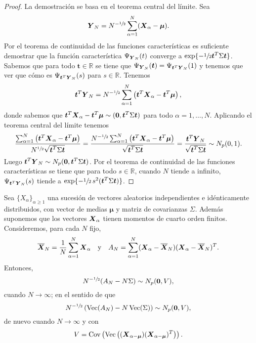 \begin{proof}
  La demostración se basa en el teorema central del límite.
  Sea \[
  \boldsymbol{Y}_N = N^{-\sfrac{1}{2}} \sum_{\alpha = 1}^N (\boldsymbol{X}_{\alpha} - \boldsymbol \mu).
  \]
  Por el teorema de continuidad de las funciones características es suficiente demostrar que la función característica \(\Psi_{\boldsymbol{Y}_N}(t)\) converge a \(\exp\{-\sfrac{1}{2}\boldsymbol t^T\Sigma\boldsymbol t\}\).
  Sabemos que para todo \(\boldsymbol t \in \mathbb R \) se tiene que \(\Psi_{\boldsymbol{Y}_N}(\boldsymbol t) = \Psi_{\boldsymbol t^T\boldsymbol{Y}_N}(1)\) y tenemos que ver que cómo es \(\Psi_{\boldsymbol t^T \boldsymbol{Y}_N}(s)\) para \(s \in \mathbb R\).
  Tenemos \[
    \boldsymbol t^T\boldsymbol{Y}_N = N^{-\sfrac{1}{2}}\sum_{\alpha = 1}^{N}\left(\boldsymbol t^T\boldsymbol{X}_{\alpha} - \boldsymbol t^T\boldsymbol\mu\right),
  \]
  donde sabemos que \(\boldsymbol t^T \boldsymbol{X}_{\alpha} - \boldsymbol t^T \boldsymbol \mu \sim (\boldsymbol 0, \boldsymbol t^T\Sigma \boldsymbol t)\) para todo \(\alpha = 1, \dots, N\).
  Aplicando el teorema central del límite tenemos \[
    \frac{\sum_{\alpha = 1}^{N}\left(\boldsymbol t^T\boldsymbol{X}_{\alpha} - \boldsymbol t^T\boldsymbol\mu\right)}{N^{\sfrac{1}{2}}\sqrt{\boldsymbol t^T\Sigma \boldsymbol t}} 
    = \frac{N^{-\sfrac{1}{2}}\sum_{\alpha = 1}^{N}\left(\boldsymbol t^T\boldsymbol{X}_{\alpha} - \boldsymbol t^T\boldsymbol\mu\right)}{\sqrt{\boldsymbol t^T\Sigma \boldsymbol t}}
    = \frac{\boldsymbol t^T \boldsymbol{Y}_N}{\sqrt{\boldsymbol t^T\Sigma \boldsymbol t}}
    \sim N_p(0, 1).
  \]
  Luego \(\boldsymbol t^T\boldsymbol{Y}_N \sim N_p(\boldsymbol 0, \boldsymbol t^T \Sigma \boldsymbol t)\). 
  Por el teorema de continuidad de las funciones características se tiene que para todo \(s \in \mathbb R\), cuando \(N\) tiende a infinito, \(\Psi_{\boldsymbol t^T\boldsymbol{Y}_N}(s)\) tiende a \(\exp\{-\sfrac{1}{2}\,s^2(\boldsymbol t^T\Sigma \boldsymbol t)\}\).
\end{proof}

\begin{nprop}
  Sea \(\{X_{\alpha}\}_{\alpha \geq 1}\) una sucesión de vectores aleatorios independientes e idénticamente distribuidos, con vector de medias \(\boldsymbol \mu\) y matriz de covarianzas \(\Sigma\).
  Además suponemos que los vectores \(\boldsymbol{X}_{\alpha}\) tienen momentos de cuarto orden finitos.
  Consideremos, para cada \(N\) fijo,
  \[
    \overline{\boldsymbol{X}}_N = \frac{1}{N}\sum_{\alpha = 1}^N \boldsymbol{X}_{\alpha}
    \quad
    \text{y}
    \quad
    A_N = \sum_{\alpha = 1}^N (\boldsymbol{X}_{\alpha} - \overline{\boldsymbol{X}}_N)(\boldsymbol{X}_{\alpha} - \overline{\boldsymbol{X}}_N)^T.
  \]
  Entonces, \[
    N^{-\sfrac{1}{2}}(A_N - N\Sigma) \sim N_p(\boldsymbol 0, V),
  \] cuando \(N \to \infty\); en el sentido de que \[
    N^{-\sfrac{1}{2}}\left(\operatorname{Vec}(A_N) - N\operatorname{Vec}(\Sigma)\right) \sim N_p(\boldsymbol 0, V),
  \] de nuevo cuando \(N \to \infty\) y con \[
    V = \operatorname{Cov}\left(\operatorname{Vec}\left((\boldsymbol{X}_{\alpha - \boldsymbol \mu})(\boldsymbol{X}_{\alpha - \boldsymbol \mu})^T\right)\right).
  \]
\end{nprop}

